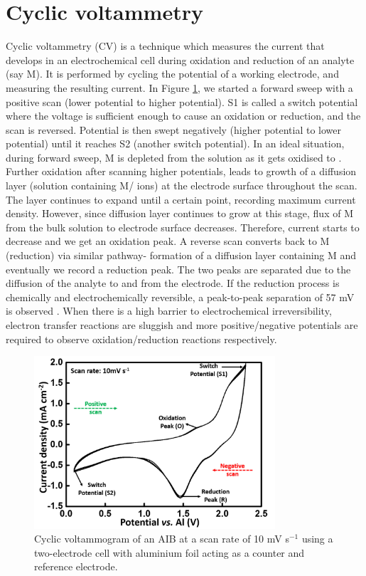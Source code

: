 \section{Cyclic voltammetry}
Cyclic voltammetry (CV) is a technique which measures the current that develops in an electrochemical cell during oxidation and reduction of an analyte (say M). It is performed by cycling the potential of a working electrode, and measuring the resulting current. In Figure \ref{Figures/chap2fig:CV}, we started a forward sweep with a positive scan (lower potential to higher potential). S1 is called a switch potential where the voltage is sufficient enough to cause an oxidation or reduction, and the scan is reversed. Potential is then swept negatively (higher potential to lower potential) until it reaches S2 (another switch potential). In an ideal situation, during forward sweep, M is depleted from the solution as it gets oxidised to . Further oxidation after scanning higher potentials, leads to growth of a diffusion layer (solution containing M/ ions) at the electrode surface throughout the scan. The layer continues to expand until a certain point, recording maximum current density. However, since diffusion layer continues to grow at this stage, flux of M from the bulk solution to electrode surface decreases. Therefore, current starts to decrease and we get an oxidation peak. A reverse scan converts  back to M (reduction) via similar pathway- formation of a diffusion layer containing M and eventually we record a reduction peak. The two peaks are separated due to the diffusion of the analyte to and from the electrode. If the reduction process is chemically and electrochemically reversible, a peak-to-peak separation of 57 mV is observed \cite{bard_electrochemical_1980}. When there is a high barrier to electrochemical irreversibility, electron transfer reactions are sluggish and more positive/negative potentials are required to observe oxidation/reduction reactions respectively. 

\begin{figure}[tbh!]
\centering
\includegraphics[width=0.8\textwidth]{Figures/chap2fig/CV}
\caption{Cyclic voltammogram of an AIB at a scan rate of 10 mV s$^{-1}$ using a two-electrode cell with aluminium foil acting as a counter and reference electrode.}
\label{Figures/chap2fig:CV}
\end{figure}

